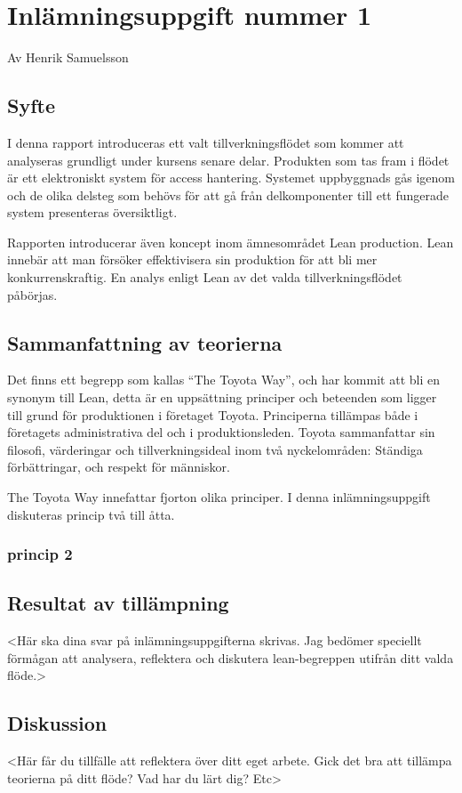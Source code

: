 \documentclass{article}
\begin{document}
\section*{Inlämningsuppgift nummer 1}
Av Henrik Samuelsson
\subsection*{Syfte}
I denna rapport introduceras ett valt tillverkningsflödet som kommer att analyseras grundligt under kursens senare delar. Produkten som tas fram i flödet är  ett elektroniskt system för access hantering. Systemet uppbyggnads gås igenom och de olika delsteg som behövs för att gå från delkomponenter till ett fungerade system presenteras översiktligt.

Rapporten introducerar även koncept inom ämnesområdet Lean production. Lean innebär att man försöker effektivisera sin produktion för att bli mer konkurrenskraftig. En analys enligt Lean av det valda tillverkningsflödet påbörjas.

\subsection*{Sammanfattning av teorierna}
Det finns ett begrepp som kallas ``The Toyota Way'', och har kommit att bli en synonym till Lean, detta är en uppsättning principer och beteenden som ligger till grund för produktionen i företaget Toyota. Principerna tillämpas både i företagets administrativa del och i produktionsleden. Toyota sammanfattar sin filosofi, värderingar och tillverkningsideal inom två nyckelområden: Ständiga förbättringar, och respekt för människor.

The Toyota Way innefattar fjorton olika principer. I denna inlämningsuppgift diskuteras princip två till åtta.
\subsubsection*{princip 2}


\subsection*{Resultat av tillämpning}
<Här ska dina svar på inlämningsuppgifterna skrivas. Jag bedömer speciellt förmågan att analysera,
reflektera och diskutera lean-begreppen utifrån ditt valda flöde.>
\subsection*{Diskussion}
<Här får du tillfälle att reflektera över ditt eget arbete. Gick det bra att tillämpa teorierna på ditt
flöde? Vad har du lärt dig? Etc>
\end{document}
